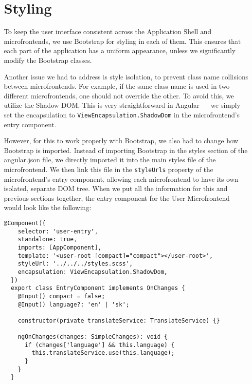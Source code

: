 \section{Styling}
To keep the user interface consistent across the Application Shell and microfrontends, we use Bootstrap for styling in each of them. This ensures that each part of the application has a uniform appearance, unless we significantly modify the Bootstrap classes.

Another issue we had to address is style isolation, to prevent class name collisions between microfrontends. For example, if the same class name is used in two different microfrontends, one should not override the other. To avoid this, we utilize the Shadow DOM. This is very straightforward in Angular — we simply set the encapsulation to \texttt{ViewEncapsulation.ShadowDom} in the microfrontend's entry component.

However, for this to work properly with Bootstrap, we also had to change how Bootstrap is imported. Instead of importing Bootstrap in the styles section of the angular.json file, we directly imported it into the main styles file of the microfrontend. We then link this file in the \texttt{styleUrls} property of the microfrontend's entry component, allowing each microfrontend to have its own isolated, separate DOM tree. When we put all the information for this and previous sections together, the entry component for the User Microfrontend would look like the following:
\begin{lstlisting}[caption={Entry component implementation with Shadow DOM encapsulation and language support for the User Microfrontend}]
  @Component({
    selector: 'user-entry',
    standalone: true,
    imports: [AppComponent],
    template: '<user-root [compact]="compact"></user-root>',
    styleUrl: '../../../styles.scss',
    encapsulation: ViewEncapsulation.ShadowDom,
  })
  export class EntryComponent implements OnChanges {
    @Input() compact = false;
    @Input() language?: 'en' | 'sk';
  
    constructor(private translateService: TranslateService) {}
  
    ngOnChanges(changes: SimpleChanges): void {
      if (changes['language'] && this.language) {
        this.translateService.use(this.language);
      }
    }
  }
\end{lstlisting}